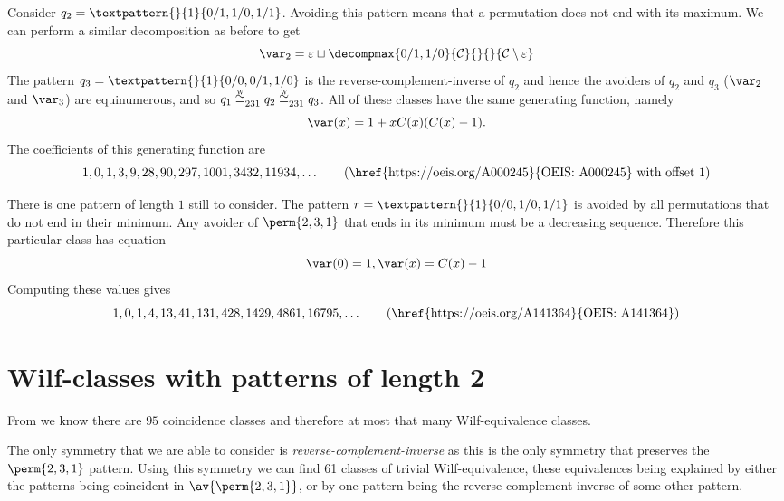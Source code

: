 Consider \(q_2 = \textpattern{}{1}{0/1,1/0,1/1}\). Avoiding this pattern
means that a permutation does not end with its maximum. We can perform a
similar
decomposition as before to get
\begin{equation*}
    \mathcal{\var}_2 =\varepsilon \sqcup
\decompmax{0/1,1/0}{\mathcal{C}}{}{}{\mathcal{C}\setminus\varepsilon}
\end{equation*}
The pattern \(q_3 = \textpattern{}{1}{0/0,0/1,1/0}\) is the
reverse-complement-inverse of \(q_2\) and hence the avoiders of \(q_2\) and
\(q_3\) (\(\scriptvar_2\) and \(\scriptvar_3\)) are equinumerous, and so \(q_1
\weqv{231} q_2 \weqv{231}q_3\). All of these classes have the same generating
function, namely
\begin{equation}
    \var(x) = 1 + xC(x)(C(x)-1). \label{eqn:maxlgen}
\end{equation}
The coefficients of this generating function are
\begin{equation*}
    1, 0, 1, 3, 9, 28, 90, 297, 1001, 3432, 11934,\dotsc
\tag{\href{https://oeis.org/A000245}{OEIS: A000245} with offset \(1\)}
\end{equation*}

\nextvar[\varmaxl]
There is one pattern of length \(1\) still to consider. The pattern
\(r = \textpattern{}{1}{0/0,1/0,1/1}\) is avoided by all permutations
that do not end in their minimum. Any avoider of \(\perm{2,3,1}\) that
ends in its minimum must be a decreasing sequence.
Therefore this particular class has equation
\begin{equation*}
    \var(0) = 1, \var(x) = C(x)-1
\end{equation*}
Computing these values gives
\begin{equation*}
    	1, 0, 1, 4, 13, 41, 131, 428, 1429, 4861, 16795,\dotsc
\tag{\href{https://oeis.org/A141364}{OEIS: A141364}}
\end{equation*}

\section{Wilf-classes with patterns of length 2}
From  we know there are \(95\) coincidence classes and
therefore at most that many Wilf-equivalence classes.

The only symmetry that we are able to consider is
\emph{reverse-complement-inverse} as this is the only symmetry that preserves
the \(\perm{2,3,1}\) pattern. Using this symmetry we can find 61 classes of
trivial Wilf-equivalence, these equivalences being explained by either the
patterns being coincident in \(\av{\perm{2,3,1}}\), or by one pattern being the
reverse-complement-inverse of some other pattern.

